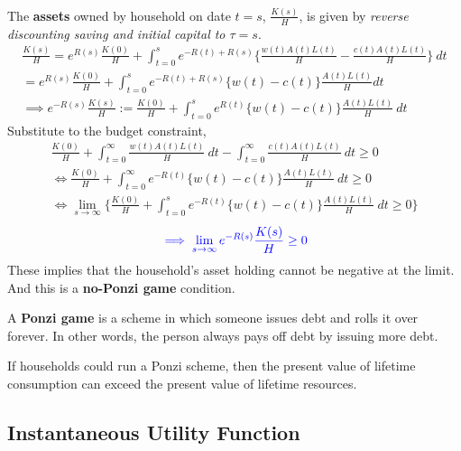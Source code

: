 \documentclass[11pt]{article}
\begin{document}
	\\
	The \textbf{assets} owned by household on date $t=s$, $\frac{K(s)}{H}$, is given by \emph{reverse discounting saving and initial capital to $\tau=s$}.
	\begin{gather*}
		\frac{K(s)}{H} = e^{R(s)} \frac{K(0)}{H} + \int_{t=0}^s e^{-R(t)+R(s)} \Big\{\frac{w(t)A(t)L(t)}{H} - \frac{c(t)A(t)L(t)}{H} \Big\}\ dt \\
		= e^{R(s)} \frac{K(0)}{H} +  \int_{t=0}^s e^{-R(t)+R(s)} \{w(t) - c(t)\} \frac{A(t)L(t)}{H} dt \\
		\implies e^{-R(s)} \frac{K(s)}{H} := \frac{K(0)}{H} + \int_{t=0}^s e^{R(t)} \{w(t) - c(t)\} \frac{A(t)L(t)}{H}\ dt
	\end{gather*}
	Substitute to the budget constraint,
	\begin{gather*}
		\frac{K(0)}{H} + \int_{t=0}^\infty \frac{w(t)A(t)L(t)}{H}\ dt - \int_{t=0}^\infty \frac{c(t)A(t)L(t)}{H}\ dt \geq 0 \\
		\iff \frac{K(0)}{H} + \int_{t=0}^\infty e^{-R(t)} \{w(t) - c(t)\} \frac{A(t)L(t)}{H}\ dt \geq 0 \\
		\iff \lim_{s \to \infty}\Big\{ \frac{K(0)}{H} + \int_{t=0}^s e^{-R(t)} \{w(t) - c(t)\} \frac{A(t)L(t)}{H}\ dt \geq 0 \Big \}
	\end{gather*}
	\begin{equation}
		\textcolor{blue}{
			\implies \lim_{s\to \infty}e^{-R(s)}\frac{K(s)}{H} \geq 0
		}
	\end{equation}
	These implies that the household's asset holding cannot be negative at the limit. And this is a \textbf{no-Ponzi game} condition.
	
	\begin{definition}
		A \textbf{Ponzi game} is a scheme in which someone issues debt and rolls it over forever. In other words, the person always pays off debt by issuing more debt.
	\end{definition}
	
	\begin{remark}
		If households could run a Ponzi scheme, then the present value of lifetime consumption can exceed the present value of lifetime resources.
	\end{remark}
	
	\subsection{Instantaneous Utility Function}
	
\end{document}
